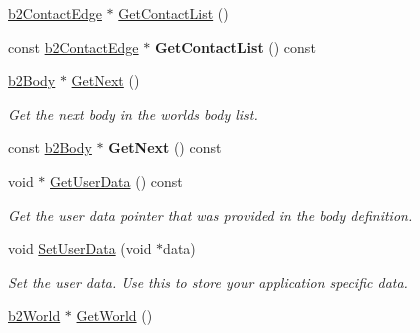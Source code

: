 \begin{DoxyCompactItemize}
\item 
\hyperlink{structb2_contact_edge}{b2\+Contact\+Edge} $\ast$ \hyperlink{classb2_body_a16bdbfb266c82a0ef51be351a8928bc5}{Get\+Contact\+List} ()
\item 
const \hyperlink{structb2_contact_edge}{b2\+Contact\+Edge} $\ast$ {\bfseries Get\+Contact\+List} () const \hypertarget{classb2_body_aee5445ae5b170ad14c7d326040b6703e}{}\label{classb2_body_aee5445ae5b170ad14c7d326040b6703e}

\item 
\hyperlink{classb2_body}{b2\+Body} $\ast$ \hyperlink{classb2_body_ad54182a11d02362b027a0eb072775bdc}{Get\+Next} ()\hypertarget{classb2_body_ad54182a11d02362b027a0eb072775bdc}{}\label{classb2_body_ad54182a11d02362b027a0eb072775bdc}

\begin{DoxyCompactList}\small\item\em Get the next body in the world\textquotesingle{}s body list. \end{DoxyCompactList}\item 
const \hyperlink{classb2_body}{b2\+Body} $\ast$ {\bfseries Get\+Next} () const \hypertarget{classb2_body_a2c7dc95d66e41c9150e98ea4ff401ad9}{}\label{classb2_body_a2c7dc95d66e41c9150e98ea4ff401ad9}

\item 
void $\ast$ \hyperlink{classb2_body_a6833f7e2ef1b6ac82641bb6b07ec50d1}{Get\+User\+Data} () const \hypertarget{classb2_body_a6833f7e2ef1b6ac82641bb6b07ec50d1}{}\label{classb2_body_a6833f7e2ef1b6ac82641bb6b07ec50d1}

\begin{DoxyCompactList}\small\item\em Get the user data pointer that was provided in the body definition. \end{DoxyCompactList}\item 
void \hyperlink{classb2_body_a5553a5ecdfd2d7200ba2405ce6043f52}{Set\+User\+Data} (void $\ast$data)\hypertarget{classb2_body_a5553a5ecdfd2d7200ba2405ce6043f52}{}\label{classb2_body_a5553a5ecdfd2d7200ba2405ce6043f52}

\begin{DoxyCompactList}\small\item\em Set the user data. Use this to store your application specific data. \end{DoxyCompactList}\item 
\hyperlink{classb2_world}{b2\+World} $\ast$ \hyperlink{classb2_body_abfd9466763b20977f9122d0e162dfeb9}{Get\+World} ()\hypertarget{classb2_body_abfd9466763b20977f9122d0e162dfeb9}{}\label{classb2_body_abfd9466763b20977f9122d0e162dfeb9}


\end{DoxyCompactItemize}
